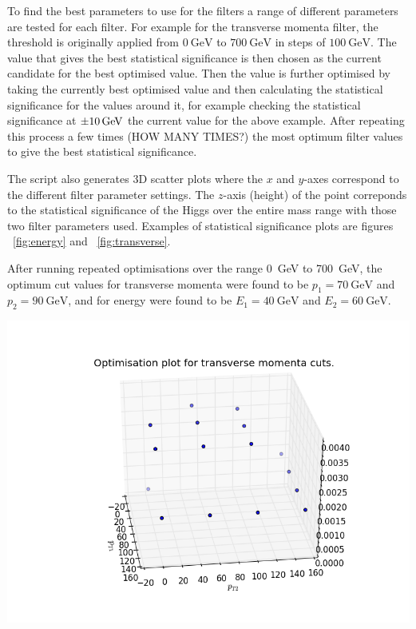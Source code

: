 \documentclass[11pt]{amsart}
\newenvironment{Figure}
  {\par\medskip\noindent\minipage{\linewidth}}
  {\endminipage\par\medskip}
\begin{document}
\begin{multicols}{2}
To find the best parameters to use for the filters a range of different parameters are tested for each filter. For example for the transverse momenta filter, the threshold is originally applied from $\SI{0}{\giga\electronvolt}$ to $\SI{700}{\giga\electronvolt}$ in steps of $\SI{100}{\giga\electronvolt}$. The value that gives the best statistical significance is then chosen as the current candidate for the best optimised value. Then the value is further optimised by taking the currently best optimised value and then calculating the statistical significance for the values around it, for example checking the statistical significance at $\SI{\pm10}{\giga\electronvolt}$ the current value for the above example. After repeating this process a few times (HOW MANY TIMES?) the most optimum filter values to give the best statistical significance.

The script also generates 3D scatter plots where the $x$ and $y$-axes correspond to the different filter parameter settings. The $z$-axis (height) of the point correponds to the statistical significance of the Higgs over the entire mass range with those two filter parameters used. Examples of statistical significance plots are figures ~\ref{fig:energy} and ~\ref{fig:transverse}.

After running repeated optimisations over the range \SI{0}{\giga\electronvolt} to \SI{700}{\giga\electronvolt}, the optimum cut values for transverse momenta were found to be $p_1 = \SI{70}{\giga\electronvolt}$ and $p_2 = \SI{90}{\giga\electronvolt}$, and for energy were found to be $E_1 = \SI{40}{\giga\electronvolt}$ and $E_2 = \SI{60}{\giga\electronvolt}$.

\begin{Figure}
  \centering
  \includegraphics[width=\linewidth]{transverse}
  \label{fig:transverse}
\end{Figure}



\end{multicols}
\end{document}
